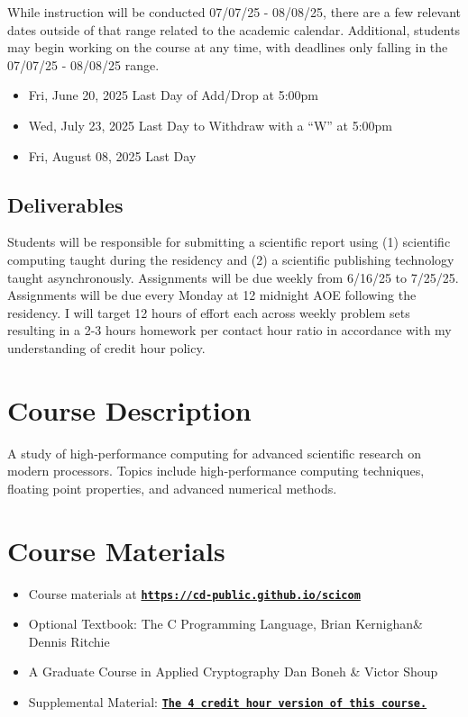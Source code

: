 \documentclass[11pt]{article}
\begin{document}
While instruction will be conducted  07/07/25 - 08/08/25, there are a few relevant dates outside of that range related to the academic calendar. Additional, students may begin working on the course at any time, with deadlines only falling in the  07/07/25 - 08/08/25 range.

\begin{itemize}
	\item Fri, June 20, 2025 Last Day of Add/Drop at 5:00pm
	\item Wed, July 23, 2025 Last Day to Withdraw with a “W” at 5:00pm
	\item Fri, August 08, 2025 Last Day
\end{itemize}

\subsection*{Deliverables} 

Students will be responsible for submitting a scientific report using (1) scientific computing taught during the residency and (2) a scientific publishing technology taught asynchronously. Assignments will be due weekly from 6/16/25 to 7/25/25. Assignments will be due every Monday at 12 midnight AOE following the residency.  I
will target 12 hours of effort each across weekly problem sets resulting in a 2-3 hours homework
per contact hour ratio in accordance with my understanding of credit hour policy.


\section*{Course Description}

A study of high-performance computing for advanced scientific research on modern processors. Topics include high-performance computing techniques, floating point properties, and advanced numerical methods.


\section*{Course Materials}

\begin{itemize}
\item Course materials at \href{https://cd-public.github.io/scicom/}{\tt\bf https://cd-public.github.io/scicom}
\item Optional Textbook: The C Programming Language, Brian Kernighan\& Dennis Ritchie
\item A Graduate Course in Applied Cryptography Dan Boneh \& Victor Shoup
\item Supplemental Material: \href{https://cd-public.github.io/courses/old/c89s25/index.html/}{\tt\bf The 4 credit hour version of this course.}
\end{itemize}
\end{document}
